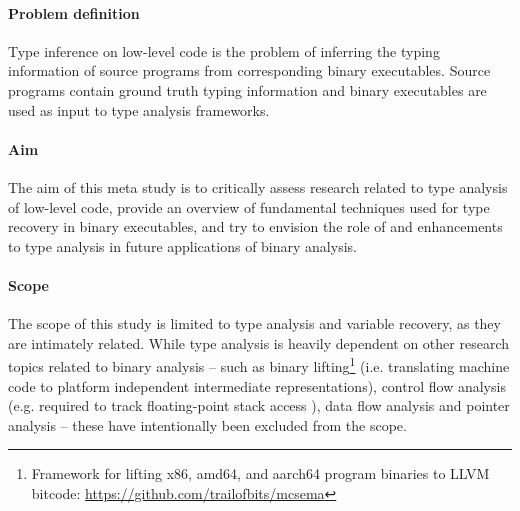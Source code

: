 

\paragraph{Problem definition}

Type inference on low-level code is the problem of inferring the typing information of source programs from corresponding binary executables. Source programs contain ground truth typing information and binary executables are used as input to type analysis frameworks.


\paragraph{Aim}

The aim of this meta study is to critically assess research related to type analysis of low-level code, provide an overview of fundamental techniques used for type recovery in binary executables, and try to envision the role of and enhancements to type analysis in future applications of binary analysis.


\paragraph{Scope}

The scope of this study is limited to type analysis and variable recovery, as they are intimately related. While type analysis is heavily dependent on other research topics related to binary analysis -- such as binary lifting\footnote{Framework for lifting x86, amd64, and aarch64 program binaries to LLVM bitcode: \url{https://github.com/trailofbits/mcsema}} (i.e. translating machine code to platform independent intermediate representations), control flow analysis (e.g. required to track floating-point stack access \cite{tie_reverse_engineering_of_types}), data flow analysis and pointer analysis -- these have intentionally been excluded from the scope.
